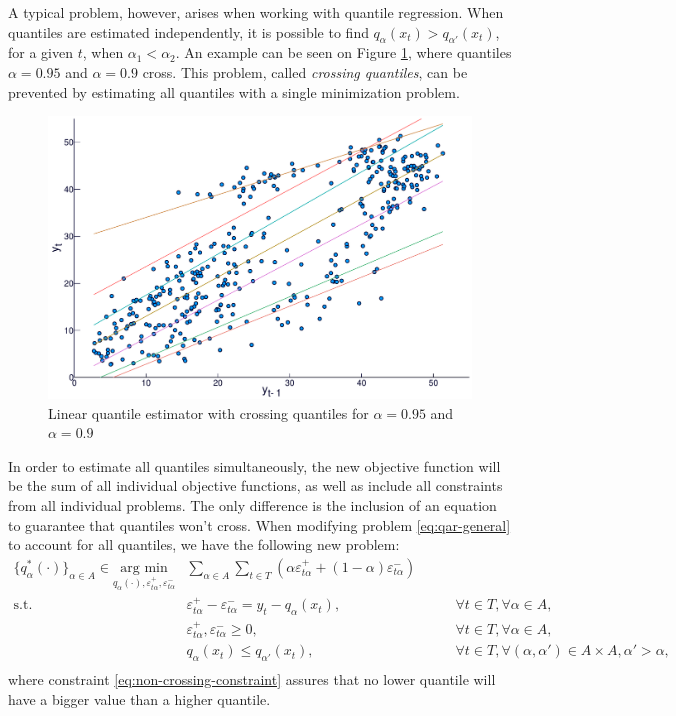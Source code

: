 A typical problem, however, arises when working with quantile regression. When quantiles are estimated independently, it is possible to find $q_{\alpha}(x_t) > q_{\alpha'}(x_t)$, for a given $t$, when $\alpha_1 < \alpha_2$. An example can be seen on Figure \ref{fig:crossing-quantiles}, where quantiles $\alpha = 0.95$ and $\alpha = 0.9$ cross. This problem, called \textit{crossing quantiles}, can be prevented by estimating all quantiles with a single minimization problem.
\begin{figure}
	\centering
	\includegraphics[width=0.6\linewidth]{./../Figuras/regressao-quantilica/icaraizinho-quantile-linear-scatter-crossing}
	\caption{Linear quantile estimator with crossing quantiles for $\alpha = 0.95$ and $\alpha = 0.9$}
	\label{fig:crossing-quantiles}
\end{figure}

In order to estimate all quantiles simultaneously, the new objective function will be the sum of all individual objective functions, as well as include all constraints from all individual problems. The only difference is the inclusion of an equation to guarantee that quantiles won't cross.  When modifying problem \ref{eq:qar-general} to account for all quantiles, we have the following new problem:
\begin{eqnarray}
\label{eq:non-crossing-quantiles1}
\{q^*_{\alpha}(\cdot)\}_{\alpha \in A}  \in \underset{q_\alpha(\cdot),\varepsilon_{t \alpha}^{+}, \varepsilon_{t \alpha}^-}{\text{arg min}} &  \sum_{\alpha \in A} \sum_{t \in T}\left(\alpha \varepsilon_{t \alpha}^++(1-\alpha)\varepsilon_{t \alpha}^{-}\right) &  \\
\mbox{s.t. } & \varepsilon_{t \alpha}^{+}-\varepsilon_{t \alpha}^{-}=y_{t}-q_\alpha(x_{t}), & \qquad\forall t \in T,\forall \alpha \in A,\\
& \varepsilon_{t \alpha}^+,\varepsilon_{t \alpha}^- \geq 0, & \qquad\forall t \in T,\forall \alpha \in A,\\\label{eq:non-crossing-constraint}
& q_{\alpha}(x_t) \leq q_{\alpha'}(x_t), & \qquad \forall t \in T, \forall (\alpha, \alpha') \in A \times A,  \alpha' > \alpha,\nonumber\\
\end{eqnarray}
where constraint \ref{eq:non-crossing-constraint} assures that no lower quantile will have a bigger value than a higher quantile.





